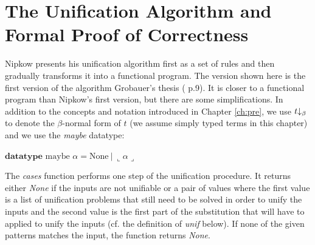 \chapter{The Unification Algorithm and Formal Proof of Correctness}
\label{ch:unif}

Nipkow \cite{Nipkow-LICS-93} presents his unification algorithm first as a set of rules and then gradually transforms it into a functional program. The version shown here is the first version of the algorithm Grobauer's thesis (\cite{Grobauer} p.9). It is closer to a functional program than Nipkow's first version, but there are some simplifications. In addition to the concepts and notation introduced in Chapter \ref{ch:pre}, we use $t\mkern-5mu\downarrow_\beta$ to denote the $\beta$-normal form of $t$ (we assume simply typed terms in this chapter) and we use the \textit{maybe} datatype:

$\textbf{datatype } \text{maybe } \alpha = \text{None} \ | \ \llcorner \alpha \lrcorner$

The \textit{cases} function performs one step of the unification procedure. It returns either \textit{None} if the inputs are not unifiable or a pair of values where the first value is a list of unification problems that still need to be solved in order to unify the inputs and the second value is the first part of the substitution that will have to applied to unify the inputs (cf. the definition of \textit{unif} below). If none of the given patterns matches the input, the function returns \textit{None}.

